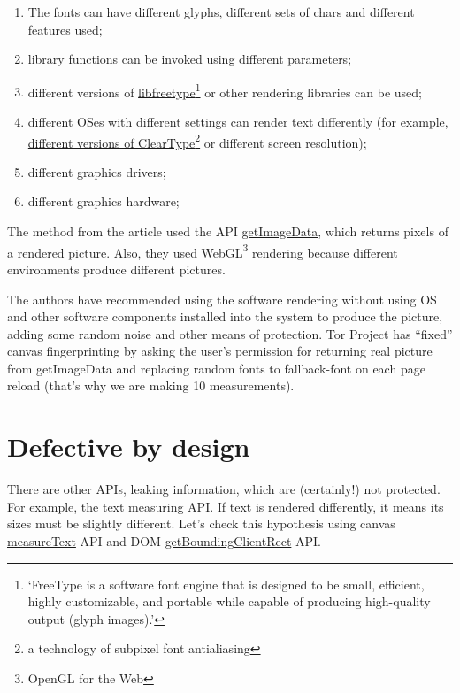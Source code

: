 \documentclass[letterpaper,14pt]{article}
\begin{document}
\begin{enumerate}
\itemsep1pt\parskip0pt
\item
  The fonts can have different glyphs, different sets of chars and different features used;
\item
  library functions can be invoked using different parameters;
\item
  different versions of \href{http://www.freetype.org/}{libfreetype}\footnote{`FreeType is a software font engine that is designed to be small, efficient, highly customizable, and portable while capable of producing high-quality output (glyph images).'} or other rendering libraries can be used;
\item
  different OSes with different settings can render text differently (for example, \href{http://habrahabr.ru/post/247703/}{different versions of ClearType\texttrademark\footnote{a technology of subpixel font antialiasing}} or different screen resolution);
\item
  different graphics drivers;
\item
  different graphics hardware;
\end{enumerate}

The method from the article used the API \href{https://developer.mozilla.org/en-US/docs/Web/API/CanvasRenderingContext2D.getImageData}{getImageData}, which returns pixels of a rendered picture. Also, they used WebGL\footnote{OpenGL for the Web} rendering because different environments produce different pictures.

The authors have recommended using the software rendering without using OS and other software components installed into the system to produce the picture, adding some random noise and other means of protection. Tor Project has ``fixed'' canvas fingerprinting by asking the user's permission for returning real picture from getImageData and replacing random fonts to fallback-font on each page reload (that's why we are making 10 measurements).

\section{Defective by design}\label{defective-by-design}

There are other APIs, leaking information, which are (certainly!) not protected. For example, the text measuring API. If text is rendered differently, it means its sizes must be slightly different. Let's check this hypothesis using canvas \href{https://developer.mozilla.org/en-US/docs/Web/API/CanvasRenderingContext2D.measureText}{measureText} API and DOM \href{https://developer.mozilla.org/en-US/docs/Web/API/Element.getBoundingClientRect}{getBoundingClientRect} API.
\end{document}
